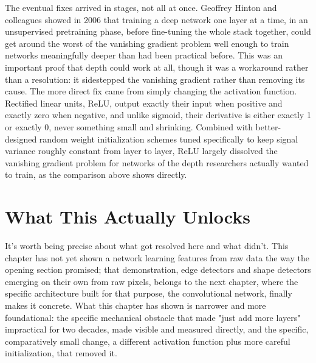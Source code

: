 The eventual fixes arrived in stages, not all at once. Geoffrey Hinton and colleagues showed in 2006 that training a deep network one layer at a time, in an unsupervised pretraining phase, before fine-tuning the whole stack together, could get around the worst of the vanishing gradient problem well enough to train networks meaningfully deeper than had been practical before. This was an important proof that depth could work at all, though it was a workaround rather than a resolution: it sidestepped the vanishing gradient rather than removing its cause. The more direct fix came from simply changing the activation function. Rectified linear units, ReLU, output exactly their input when positive and exactly zero when negative, and unlike sigmoid, their derivative is either exactly 1 or exactly 0, never something small and shrinking. Combined with better-designed random weight initialization schemes tuned specifically to keep signal variance roughly constant from layer to layer, ReLU largely dissolved the vanishing gradient problem for networks of the depth researchers actually wanted to train, as the comparison above shows directly.

\section*{What This Actually Unlocks}

It's worth being precise about what got resolved here and what didn't. This chapter has not yet shown a network learning features from raw data the way the opening section promised; that demonstration, edge detectors and shape detectors emerging on their own from raw pixels, belongs to the next chapter, where the specific architecture built for that purpose, the convolutional network, finally makes it concrete. What this chapter has shown is narrower and more foundational: the specific mechanical obstacle that made "just add more layers" impractical for two decades, made visible and measured directly, and the specific, comparatively small change, a different activation function plus more careful initialization, that removed it.

